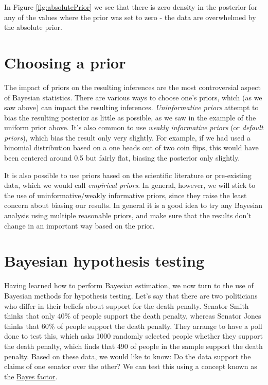\documentclass[]{book}
\theoremstyle{definition}
\theoremstyle{definition}
\theoremstyle{definition}
\theoremstyle{remark}
\begin{document}
In Figure \ref{fig:absolutePrior} we see that there is zero density in
the posterior for any of the values where the prior was set to zero -
the data are overwhelmed by the absolute prior.

\section{Choosing a prior}\label{choosing-a-prior}

The impact of priors on the resulting inferences are the most
controversial aspect of Bayesian statistics. There are various ways to
choose one's priors, which (as we saw above) can impact the resulting
inferences. \emph{Uninformative priors} attempt to bias the resulting
posterior as little as possible, as we saw in the example of the uniform
prior above. It's also common to use \emph{weakly informative priors}
(or \emph{default priors}), which bias the result only very slightly.
For example, if we had used a binomial distribution based on a one heads
out of two coin flips, this would have been centered around 0.5 but
fairly flat, biasing the posterior only slightly.

It is also possible to use priors based on the scientific literature or
pre-existing data, which we would call \emph{empirical priors}. In
general, however, we will stick to the use of uninformative/weakly
informative priors, since they raise the least concern about biasing our
results. In general it is a good idea to try any Bayesian analysis using
multiple reasonable priors, and make sure that the results don't change
in an important way based on the prior.

\section{Bayesian hypothesis testing}\label{bayesian-hypothesis-testing}

Having learned how to perform Bayesian estimation, we now turn to the
use of Bayesian methods for hypothesis testing. Let's say that there are
two politicians who differ in their beliefs about support for the death
penalty. Senator Smith thinks that only 40\% of people support the death
penalty, whereas Senator Jones thinks that 60\% of people support the
death penalty. They arrange to have a poll done to test this, which asks
1000 randomly selected people whether they support the death penalty,
which finds that 490 of people in the sample support the death penalty.
Based on these data, we would like to know: Do the data support the
claims of one senator over the other? We can test this using a concept
known as the
\href{https://bayesfactor.blogspot.com/2014/02/the-bayesfactor-package-this-blog-is.html}{Bayes
factor}.
\end{document}

